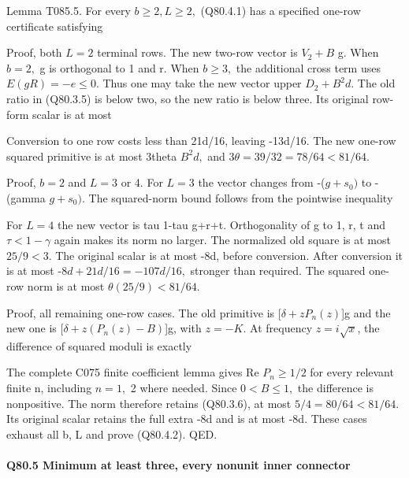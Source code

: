 Lemma T085.5. For every \(b\ge 2,\allowbreak  L\ge 2,\allowbreak \) (Q80.4.1) has a specified
one-row certificate satisfying


Proof, both \(L=2\) terminal rows. The new two-row vector is
\(V_2+B\) g. When \(b=2,\allowbreak \) g is orthogonal to 1 and r. When \(b\ge 3,\allowbreak \)
the additional cross term uses \(E(gR)=-e\le 0.\) Thus one may take
the new vector upper \(D_2+B^2d.\) The old ratio in (Q80.3.5) is below
two, so the new ratio is below three. Its original row-form
scalar is at most


Conversion to one row costs less than 21d/16, leaving -13d/16.
The new one-row squared primitive is at most 3theta \(B^2d,\allowbreak \)
and \(3\theta=39/32=78/64<81/64.\)

Proof, \(b=2\) and \(L=3\) or 4. For \(L=3\) the vector changes from
-(\(g+s_0)\) to -(gamma \(g+s_0).\) The squared-norm bound follows from the pointwise inequality


For \(L=4\) the new vector is tau 1-tau g+r+t. Orthogonality of g
to 1, r, t and \(\tau<1-\gamma\) again makes its norm no larger.
The normalized old square is at most \(25/9<3.\) The original
scalar is at most -8d, before conversion. After conversion it
is at most -\(8d+21d/16=-107d/16,\allowbreak \) stronger than required.
The squared one-row norm is at most \(\theta(25/9)<81/64.\)

Proof, all remaining one-row cases. The old primitive is
[\(\delta+zP_n(z)\)]g and the new one is [\(\delta+z(P_n(z)-B)\)]g,
with \(z=-K.\) At frequency \(z=i \sqrt{x}\), the difference of squared
moduli is exactly


The complete C075 finite coefficient lemma gives Re \(P_n\ge 1/2\)
for every relevant finite n, including \(n=1,\allowbreak \) 2 where needed.
Since \(0<B\le 1,\allowbreak \) the difference is nonpositive. The norm therefore
retains (Q80.3.6), at most \(5/4=80/64<81/64.\) Its original scalar
retains the full extra -8d and is at most -8d.
These cases exhaust all b, L and prove (Q80.4.2). QED.

\paragraph{Q80.5 Minimum at least three, every nonunit inner connector}

